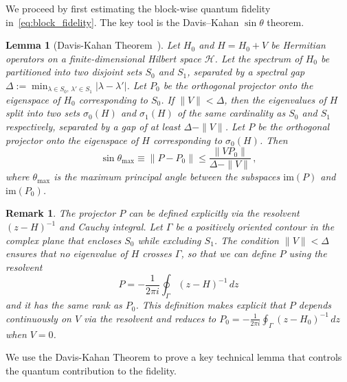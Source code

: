 \documentclass[a4paper,onecolumn,11pt]{quantumarticle}
\newtheorem{lem}{Lemma}
\newtheorem{rem}{Remark}
\begin{document}
We proceed by first estimating the block-wise quantum fidelity in~\eqref{eq:block_fidelity}. The key tool is the Davis--Kahan \(\sin\theta\) theorem.

\begin{lem}[Davis-Kahan Theorem~\cite{davis1970rotation}]\label{lem:davis_kahan}
    Let \(H_0\) and \(H = H_0 + V\) be Hermitian operators on a finite-dimensional Hilbert space \(\mathcal{H}\). Let the spectrum of \(H_0\) be partitioned into two disjoint sets \(S_0\) and \(S_1\), separated by a spectral gap \(\Delta := \min_{\lambda \in S_0,\, \lambda' \in S_1} |\lambda - \lambda'|\).
    Let \(P_0\) be the orthogonal projector onto the eigenspace of \(H_0\) corresponding to \(S_0\).
    If \(\|V\| < \Delta\), then the eigenvalues of \(H\) split into two sets \(\sigma_0(H)\) and \(\sigma_1(H)\) of the same cardinality as \(S_0\) and \(S_1\) respectively, separated by a gap of at least \(\Delta - \|V\|\).
    Let \(P\) be the orthogonal projector onto the eigenspace of \(H\) corresponding to \(\sigma_0(H)\). Then
    \begin{equation}
        \sin\theta_{\max}\equiv \|P - P_0\|\le \frac{\|V P_0\|}{\Delta - \|V\|} \,,
    \end{equation}
    where \(\theta_{\max}\) is the maximum principal angle between the subspaces \(\mathrm{im}(P)\) and \(\mathrm{im}(P_0)\).
\end{lem}

\begin{rem}
    The projector \(P\) can be defined explicitly via the resolvent $(z-H)^{-1}$ and Cauchy integral. Let \(\Gamma\) be a positively oriented contour in the complex plane that encloses \(S_0\) while excluding \(S_1\). The condition \(\|V\| < \Delta\) ensures that no eigenvalue of \(H\) crosses \(\Gamma\), so that we can define $P$ using the resolvent
    \begin{equation}
        P = -\frac{1}{2\pi i}\oint_\Gamma (z - H)^{-1}\,dz
    \end{equation}
    and it has the same rank as \(P_0\). This definition makes explicit that \(P\) depends continuously on \(V\) via the resolvent and reduces to \(P_0= -\frac{1}{2\pi i}\oint_\Gamma (z - H_0)^{-1}\,dz\) when \(V = 0\).
\end{rem}

We use the Davis-Kahan Theorem to prove a key technical lemma that controls the quantum contribution to the fidelity.
\end{document}

